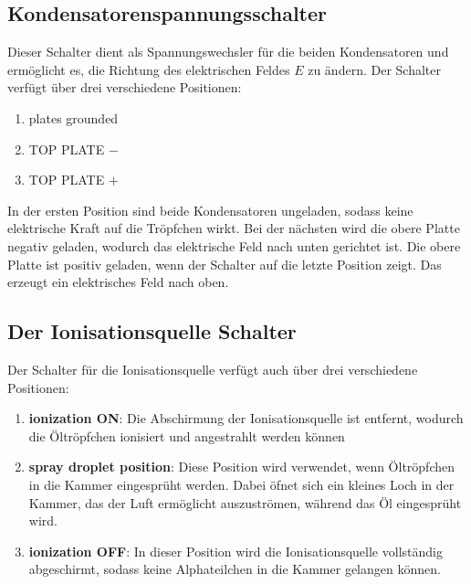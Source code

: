 \subsection{Kondensatorenspannungsschalter}\label{sub:Spannungsschalter}
Dieser Schalter dient als Spannungswechsler für die beiden Kondensatoren und ermöglicht es, die Richtung des elektrischen Feldes $E$ zu ändern. Der Schalter verfügt über drei verschiedene Positionen: 

\begin{enumerate}
	\item plates grounded
	\item TOP PLATE $-$
	\item TOP PLATE $+$
\end{enumerate}

\noindent In der ersten Position sind beide Kondensatoren ungeladen, sodass keine elektrische Kraft auf die Tröpfchen wirkt. Bei der nächsten wird die obere Platte negativ geladen, wodurch das elektrische Feld nach unten gerichtet ist. Die obere Platte ist positiv geladen, wenn der Schalter auf die letzte Position zeigt. Das erzeugt ein elektrisches Feld nach oben.

\subsection{Der Ionisationsquelle Schalter}\label{sub:ionisationquelle}
Der Schalter für die Ionisationsquelle verfügt auch über drei verschiedene Positionen: 

\begin{enumerate}
	\item \textbf{ionization ON}: Die Abschirmung der Ionisationsquelle ist entfernt, wodurch die Öltröpfchen ionisiert und angestrahlt werden können 
	\item \textbf{spray droplet position}: Diese Position wird verwendet, wenn Öltröpfchen in die Kammer eingesprüht werden. Dabei öfnet sich ein kleines Loch in der Kammer, das der Luft ermöglicht auszuströmen, während das Öl eingesprüht wird.
	\item \textbf{ionization OFF}: In dieser Position wird die Ionisationsquelle vollständig abgeschirmt, sodass keine Alphateilchen in die Kammer gelangen können.
\end{enumerate}

